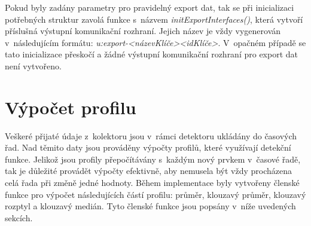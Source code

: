 Pokud byly zadány parametry pro pravidelný export dat, tak se při inicializaci potřebných struktur
zavolá funkce s~názvem \textit{initExportInterfaces()}, která vytvoří příslušná výstupní komunikační 
rozhraní. Jejich název je vždy vygenerován v~následujícím formátu: 
\textit{u:export-<názevKlíče><idKlíče>}. V~opačném případě se tato inicializace přeskočí a žádné
výstupní komunikační rozhraní pro export dat není vytvořeno.
   
\section{Výpočet profilu} \label{profileDef}
Veškeré přijaté údaje z~kolektoru jsou v~rámci detektoru ukládány do časových řad. Nad těmito 
daty jsou prováděny výpočty profilů, které využívají detekční funkce. Jelikož jsou profily
přepočítávány s~každým nový prvkem v~časové řadě, tak je důležité provádět výpočty efektivně, 
aby nemusela být vždy procházena celá řada při změně jedné hodnoty. Během implementace byly
vytvořeny členské funkce pro výpočet následujících částí profilu: průměr, klouzavý průměr, klouzavý rozptyl a
klouzavý medián. Tyto členské funkce jsou popsány v~níže uvedených sekcích.

